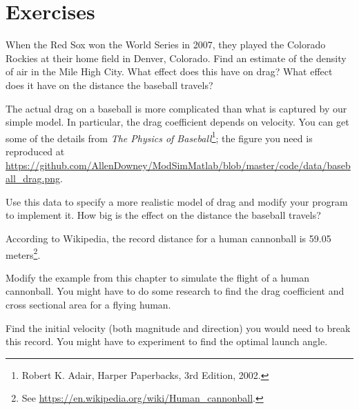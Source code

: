 \documentclass[
]{book}
\numberwithin{Answer}{chapter}
\numberwithin{Exercise}{chapter}
\begin{document}
\section{Exercises}

\begin{ex}
When the Red Sox won the World Series in 2007, they played the
Colorado Rockies at their home field in Denver, Colorado.  Find an
estimate of the density of air in the Mile High City.  What effect
does this have on drag?  What effect does it have on the distance the baseball travels?
\end{ex}

\begin{ex}
The actual drag on a baseball is more complicated than what is
captured by our simple model.  In particular, the drag coefficient
depends on velocity.  You can get some of the details from {\em The
Physics of Baseball}\footnote{Robert K. Adair, Harper Paperbacks, 3rd
Edition, 2002.}; the figure you need is reproduced at \url{https://github.com/AllenDowney/ModSimMatlab/blob/master/code/data/baseball_drag.png}.

Use this data to specify a more realistic model of drag and modify your
program to implement it.  How big is the effect on the distance the baseball travels?
\end{ex}


\begin{ex}
\label{ex:cannon}
According to Wikipedia, the record distance for a human cannonball is 59.05 meters\footnote{See \url{https://en.wikipedia.org/wiki/Human_cannonball}.}.

Modify the example from this chapter to simulate the flight of a human cannonball.  You might have to do some research to find the drag coefficient and cross sectional area for a flying human.

Find the initial velocity (both magnitude and direction) you would need to break this record.  You might have to experiment to find the optimal launch angle.
\end{ex}





\end{document}
